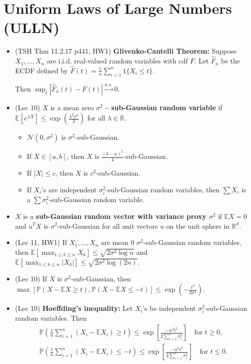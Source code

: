 \documentclass[twoside]{article}
\newcommand{\dis}{\displaystyle}
\newcommand\bbE{\mathbb{E}}
\newcommand\bbP{\mathbb{P}}
\newcommand\bbR{\mathbb{R}}
\newcommand\calN{\mathcal{N}}
\newcommand\sg{\sigma}
\newcommand\cas{\stackrel{a.s.}{\goesto}}
\newcommand\goesto{\rightarrow}
\begin{document}
\section{Uniform Laws of Large Numbers (ULLN)}
\begin{itemize}
\item (TSH Thm 11.2.17 p441, HW1) \textbf{Glivenko-Cantelli Theorem:} Suppose $X_1, \dots, X_n$ are i.i.d. real-valued random variables with cdf $F$. Let $\hat{F}_n$ be the ECDF defined by $\hat{F}(t) = \dis\frac{1}{n}\sum_{i=1}^n 1\{ X_i \leq t \}$.

Then $\dis\sup_t |\hat{F}_n(t) - F(t)| \cas 0$.

\item (Lec 10) $X$ is a mean zero \textbf{$\sigma^{2}-$sub-Gaussian random variable} if
$\mathbb{E}\left[e^{\lambda X}\right] \leq \exp\left(\frac{\lambda^{2}\sigma^{2}}{2}\right)$ for all $\lambda \in \mathbb{R}$.
\begin{itemize}
\item $\calN(0, \sg^2)$ is $\sg^2$-sub-Gaussian.
\item If $X \in [a,b]$, then $X$ is $\dis\frac{(b-a)^2}{4}$-sub-Gaussian.
\item If $|X| \leq c$, then $X$ is $c^2$-sub-Gaussian.
\item If $X_i$'s are independent $\sg_i^2$-sub-Gaussian random variables, then $\sum X_i$ is a $\sum \sg_i^2$-sub-Gaussian random variable.
\end{itemize}

\item $X$ is a \textbf{sub-Gaussian random vector with variance proxy $\sg^2$} if $\bbE X = 0$ and $u^T X$ is $\sg^2$-sub-Gaussian for all unit vectors $u$ on the unit sphere in $\bbR^d$.

\item (Lec 11, HW1) If $X_1, \dots, X_n$ are mean 0 $\sg^2$-sub-Gaussian random variables, then $\bbE \left[\dis\max_{1 \leq k \leq n} X_k \right] \leq \sqrt{2\sg^2 \log n}$ and $\bbE \left[\dis\max_{1 \leq k \leq n} |X_k| \right] \leq \sqrt{2\sg^2 \log (2n)}$.

\item (Lec 10) If $X$ is $\sg^2$-sub-Gaussian, then $\max [\bbP(X - \bbE X \geq t), \bbP(X - \bbE X \leq -t)] \leq \exp \left( -\dis\frac{t^2}{2\sg^2} \right)$.

\item (Lec 10) \textbf{Hoeffding's inequality:} Let $X_i$'s be independent $\sg_i^2$-sub-Gaussian random variables. Then
\begin{align*}
\bbP \left( \frac{1}{n}\sum_{i=1}^n (X_i - \bbE X_i) \geq t \right) \leq \exp\left[ \frac{-n^2t^{2}}{2\sum_{i=1}^{n}\sigma_{i}^{2}}\right] \quad \text{for } t \geq 0, \\
\bbP \left( \frac{1}{n}\sum_{i=1}^n (X_i - \bbE X_i) \leq -t \right) \leq \exp\left[ \frac{-n^2t^{2}}{2\sum_{i=1}^{n}\sigma_{i}^{2}}\right] \quad \text{for } t \leq 0.
\end{align*}


\end{itemize}
\end{document}
